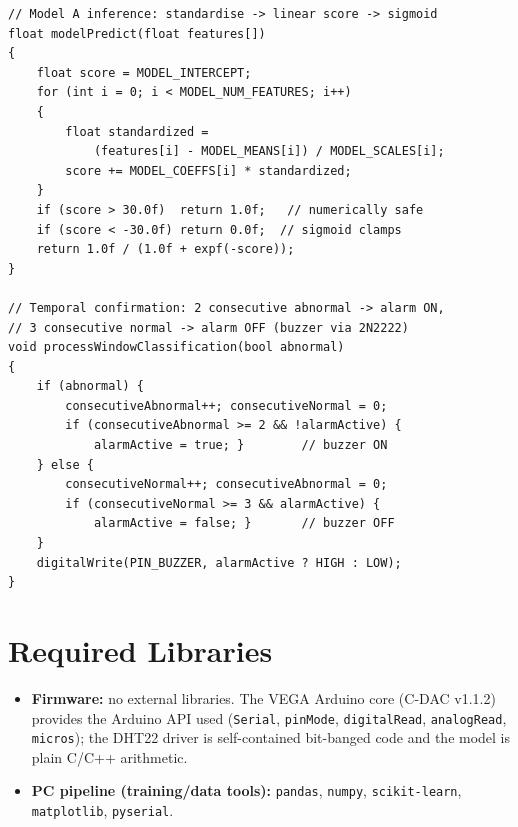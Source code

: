 \documentclass[11pt]{article}
\begin{document}
\begin{lstlisting}[style=cppstyle]
// Model A inference: standardise -> linear score -> sigmoid
float modelPredict(float features[])
{
    float score = MODEL_INTERCEPT;
    for (int i = 0; i < MODEL_NUM_FEATURES; i++)
    {
        float standardized =
            (features[i] - MODEL_MEANS[i]) / MODEL_SCALES[i];
        score += MODEL_COEFFS[i] * standardized;
    }
    if (score > 30.0f)  return 1.0f;   // numerically safe
    if (score < -30.0f) return 0.0f;  // sigmoid clamps
    return 1.0f / (1.0f + expf(-score));
}

// Temporal confirmation: 2 consecutive abnormal -> alarm ON,
// 3 consecutive normal -> alarm OFF (buzzer via 2N2222)
void processWindowClassification(bool abnormal)
{
    if (abnormal) {
        consecutiveAbnormal++; consecutiveNormal = 0;
        if (consecutiveAbnormal >= 2 && !alarmActive) {
            alarmActive = true; }        // buzzer ON
    } else {
        consecutiveNormal++; consecutiveAbnormal = 0;
        if (consecutiveNormal >= 3 && alarmActive) {
            alarmActive = false; }       // buzzer OFF
    }
    digitalWrite(PIN_BUZZER, alarmActive ? HIGH : LOW);
}
\end{lstlisting}

\section{Required Libraries}
\begin{itemize}[nosep]
  \item \textbf{Firmware:} no external libraries. The VEGA Arduino
    core (C-DAC v1.1.2) provides the Arduino API used
    (\texttt{Serial}, \texttt{pinMode}, \texttt{digitalRead},
    \texttt{analogRead}, \texttt{micros}); the DHT22 driver is
    self-contained bit-banged code and the model is plain C/C++
    arithmetic.
  \item \textbf{PC pipeline (training/data tools):} \texttt{pandas},
    \texttt{numpy}, \texttt{scikit-learn}, \texttt{matplotlib},
    \texttt{pyserial}.
\end{itemize}

\end{document}
